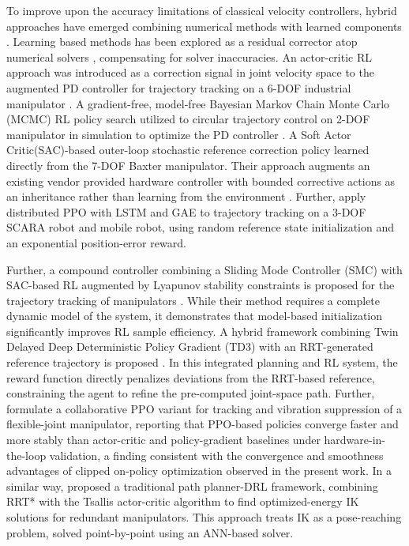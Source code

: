 \documentclass[preprint,12pt]{elsarticle}
\begin{document}
To improve upon the accuracy limitations of classical velocity controllers, hybrid approaches have emerged combining numerical methods with learned components \cite{wang2023two}. Learning based methods has been explored as a residual corrector atop numerical solvers \cite{jia2019finite,chen2019neural}, compensating for solver inaccuracies. An actor-critic RL approach was introduced as a correction signal in joint velocity space to the augmented PD controller for trajectory tracking on a 6-DOF industrial manipulator \cite{pane2016actor}. A gradient-free, model-free Bayesian Markov Chain Monte Carlo (MCMC) RL policy search utilized to circular trajectory control on 2-DOF manipulator in simulation to optimize the PD controller \cite{aghaei2022real}. A Soft Actor Critic(SAC)-based outer-loop stochastic reference correction policy learned directly from the 7-DOF Baxter manipulator. Their approach augments an existing vendor provided hardware controller with bounded corrective actions as an inheritance rather than learning from the environment \cite{pavlichenko2022real}. Further, \cite{zhang2019trajectory_1} apply distributed PPO with LSTM and GAE to trajectory tracking on a 3-DOF SCARA robot and mobile robot, using random reference state initialization and an exponential position-error reward.

Further, a compound controller combining a Sliding Mode Controller (SMC) with SAC-based RL augmented by Lyapunov stability constraints is proposed for the trajectory tracking of manipulators \cite{liu2022reinforcement, mao2025real}. While their method requires a complete dynamic model of the system, it demonstrates that model-based initialization significantly improves RL sample efficiency. A hybrid framework combining Twin Delayed Deep Deterministic Policy Gradient (TD3) with an RRT-generated reference trajectory is proposed \cite{ota}. In this integrated planning and RL system, the reward function directly penalizes deviations from the RRT-based reference, constraining the agent to refine the pre-computed joint-space path. Further, \cite{V2025104178} formulate a collaborative PPO variant for tracking and vibration suppression of a flexible-joint manipulator, reporting that PPO-based policies converge faster and more stably than actor-critic and policy-gradient baselines under hardware-in-the-loop validation, a finding consistent with the convergence and
smoothness advantages of clipped on-policy optimization observed in the present work. In a similar way, \cite{li2021general} proposed a traditional path planner-DRL framework, combining RRT* with the Tsallis actor-critic algorithm to find optimized-energy IK solutions for redundant manipulators. This approach treats IK as a pose-reaching problem, solved point-by-point using an ANN-based solver.
\end{document}
